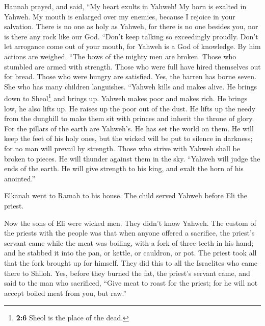  Hannah prayed, and said, ``My heart exults in Yahweh! My
horn is exalted in Yahweh. My mouth is enlarged over my enemies, because
I rejoice in your salvation.  There is no one as holy as
Yahweh, for there is no one besides you, nor is there any rock like our
God.  ``Don't keep talking so exceedingly proudly. Don't
let arrogance come out of your mouth, for Yahweh is a God of knowledge.
By him actions are weighed.  ``The bows of the mighty men
are broken. Those who stumbled are armed with strength. 
Those who were full have hired themselves out for bread. Those who were
hungry are satisfied. Yes, the barren has borne seven. She who has many
children languishes.  ``Yahweh kills and makes alive. He
brings down to Sheol\footnote{\textbf{2:6} Sheol is the place of the
  dead.} and brings up.  Yahweh makes poor and makes rich.
He brings low, he also lifts up.  He raises up the poor
out of the dust. He lifts up the needy from the dunghill to make them
sit with princes and inherit the throne of glory. For the pillars of the
earth are Yahweh's. He has set the world on them.  He will
keep the feet of his holy ones, but the wicked will be put to silence in
darkness; for no man will prevail by strength.  Those who
strive with Yahweh shall be broken to pieces. He will thunder against
them in the sky. ``Yahweh will judge the ends of the earth. He will give
strength to his king, and exalt the horn of his anointed.''

 Elkanah went to Ramah to his house. The child served
Yahweh before Eli the priest.

 Now the sons of Eli were wicked men. They didn't know
Yahweh.  The custom of the priests with the people was
that when anyone offered a sacrifice, the priest's servant came while
the meat was boiling, with a fork of three teeth in his hand;
 and he stabbed it into the pan, or kettle, or cauldron,
or pot. The priest took all that the fork brought up for himself. They
did this to all the Israelites who came there to Shiloh. 
Yes, before they burned the fat, the priest's servant came, and said to
the man who sacrificed, ``Give meat to roast for the priest; for he will
not accept boiled meat from you, but raw.''

